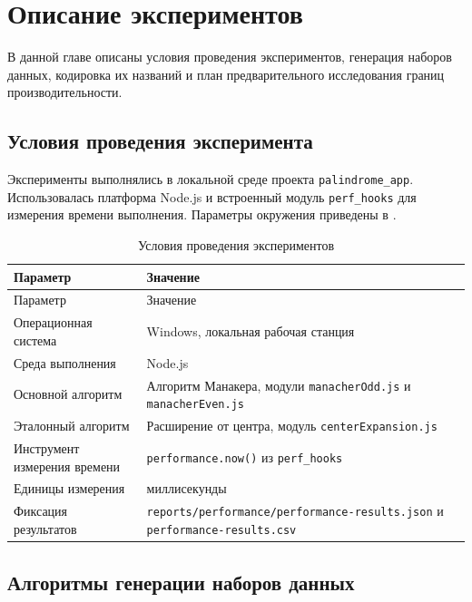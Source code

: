 \chapter{Описание экспериментов} \label{ch2}

В данной главе описаны условия проведения экспериментов, генерация наборов данных, кодировка их названий и план предварительного исследования границ производительности.

\section{Условия проведения эксперимента} \label{ch2:sec1}

Эксперименты выполнялись в локальной среде проекта \texttt{palindrome\_app}. Использовалась платформа Node.js и встроенный модуль \texttt{perf\_hooks} для измерения времени выполнения. Параметры окружения приведены в .

\noindent
\begingroup
\centering
\small
\begin{longtable}[c]{|p{5.2cm}|p{9.8cm}|}
    \caption{Условия проведения экспериментов}
    \label{tab:env}
    \\
    \hline
    Параметр & Значение \\ \hline
    \endfirsthead
    \hline
    Параметр & Значение \\ \hline
    \endhead
    \hline
    Операционная система & Windows, локальная рабочая станция \\ \hline
    Среда выполнения & Node.js \\ \hline
    Основной алгоритм & Алгоритм Манакера, модули \texttt{manacherOdd.js} и \texttt{manacherEven.js} \\ \hline
    Эталонный алгоритм & Расширение от центра, модуль \texttt{centerExpansion.js} \\ \hline
    Инструмент измерения времени & \texttt{performance.now()} из \texttt{perf\_hooks} \\ \hline
    Единицы измерения & миллисекунды \\ \hline
    Фиксация результатов & \texttt{reports/performance/performance-results.json} и \texttt{performance-results.csv} \\ \hline
\end{longtable}
\normalsize
\endgroup

\section{Алгоритмы генерации наборов данных} \label{ch2:sec2}

